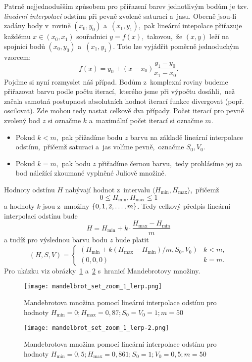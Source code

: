Patrně nejjednodušším způsobem pro přiřazení barev jednotlivým bodům je tzv. \emph{lineární interpolací} odstínu při pevně zvolené saturaci a~jasu. Obecně jsou-li zadány body v~rovině $(x_0,y_0)$ a~$(x_1,y_1)$,~pak lineární intepolace přiřazuje každému $x\in(x_0,x_1)$ souřadnici $y=f(x)$,~takovou,~že $(x,y)$ leží na spojnici bodů $(x_0,y_0)$ a~$(x_1,y_1)$. Toto lze vyjádřit poměrně jednoduchým vzorcem:
\[f(x)=y_{0}+(x-x_{0}){\frac {y_{1}-y_{0}}{x_{1}-x_{0}}}.\]
Pojďme si nyní rozmyslet náš případ. Bodům z~komplexní roviny budeme přiřazovat barvu podle počtu iterací,~kterého jsme při výpočtu dosáhli,~než začala samotná postupnost absolutních hodnot iterací funkce divergovat (popř. oscilovat). Zde mohou tedy nastat celkově dva případy. Počet iterací pro pevně zvolený bod $z$ si označme $k$ a~maximální počet iterací si označme $m$.
\begin{itemize}
    \item Pokud $k<m$,~pak přižadíme bodu $z$ barvu na základě lineární interpolace odstínu,~přičemž saturaci a~jas volíme pevně,~označme $S_0,V_0$.
    \item Pokud $k=m$,~pak bodu $z$ přiřadíme černou barvu,~tedy prohlásíme jej za bod náležící zkoumané vyplněné Juliově množině.
\end{itemize}

Hodnoty odstínu $H$ nabývají hodnot z~intervalu $\langle H_{\text{min}},H_{\text{max}}\rangle$,~přičemž
\[0\leqslant H_{\text{min}},H_{\text{max}}\leqslant 1\]
a hodnoty $k$ jsou z~množiny $\left\{0,1,2,\ldots,m\right\}$. Tedy celkový předpis lineární interpolaci odstínu bude
\[H=H_{\text{min}}+k\cdot\frac{H_{\text{max}}-H_{\text{min}}}{m}\]
a tudíž pro výslednou barvu bodu $z$ bude platit 
\[(H,S,V)=\begin{cases}
    \left(H_{\text{min}}+k(H_{\text{max}}-H_{\text{min}})/m,S_0,V_0\right) & k<m,\\
    (0,0,0) & k=m.
\end{cases}\]
Pro ukázku viz obrázky~\ref{fig:mandelbrotova-mnozina-lerp-1} a~\ref{fig:mandelbrotova-mnozina-lerp-2} s~hranicí Mandebrotovy množiny.
\begin{figure}[h]
    \centering
    \texttt{[image: mandelbrot\_set\_zoom\_1\_lerp.png]}
    \caption{Mandebrotova množina pomocí lineární interpolace odstínu pro hodnoty $H_{\text{min}}=0;H_{\text{max}}=0{,}87;S_0=V_0=1;m=50$}
    \label{fig:mandelbrotova-mnozina-lerp-1}
\end{figure}
\begin{figure}[h]
    \centering
    \texttt{[image: mandelbrot\_set\_zoom\_1\_lerp-2.png]}
    \caption{Mandebrotova množina pomocí lineární interpolace odstínu pro hodnoty $H_{\text{min}}=0{,}5;H_{\text{max}}=0{,}861;S_0=1;V_0=0{,}5;m=50$}
    \label{fig:mandelbrotova-mnozina-lerp-2}
\end{figure}

